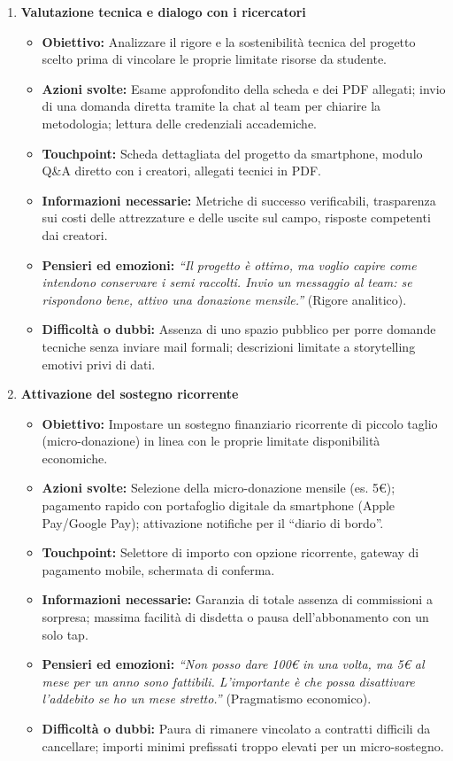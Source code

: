 \documentclass[11pt,a4paper]{article}
\begin{document}
\begin{enumerate}
        \item \textbf{Valutazione tecnica e dialogo con i ricercatori}
        \begin{itemize}
            \item \textbf{Obiettivo:} Analizzare il rigore e la sostenibilità tecnica del progetto scelto prima di vincolare le proprie limitate risorse da studente.
            \item \textbf{Azioni svolte:} Esame approfondito della scheda e dei PDF allegati; invio di una domanda diretta tramite la chat al team per chiarire la metodologia; lettura delle credenziali accademiche.
            \item \textbf{Touchpoint:} Scheda dettagliata del progetto da smartphone, modulo Q\&A diretto con i creatori, allegati tecnici in PDF.
            \item \textbf{Informazioni necessarie:} Metriche di successo verificabili, trasparenza sui costi delle attrezzature e delle uscite sul campo, risposte competenti dai creatori.
            \item \textbf{Pensieri ed emozioni:} \textit{``Il progetto è ottimo, ma voglio capire come intendono conservare i semi raccolti. Invio un messaggio al team: se rispondono bene, attivo una donazione mensile.''} (Rigore analitico).
            \item \textbf{Difficoltà o dubbi:} Assenza di uno spazio pubblico per porre domande tecniche senza inviare mail formali; descrizioni limitate a storytelling emotivi privi di dati.
        \end{itemize}

        \item \textbf{Attivazione del sostegno ricorrente}
        \begin{itemize}
            \item \textbf{Obiettivo:} Impostare un sostegno finanziario ricorrente di piccolo taglio (micro-donazione) in linea con le proprie limitate disponibilità economiche.
            \item \textbf{Azioni svolte:} Selezione della micro-donazione mensile (es. 5€); pagamento rapido con portafoglio digitale da smartphone (Apple Pay/Google Pay); attivazione notifiche per il ``diario di bordo''.
            \item \textbf{Touchpoint:} Selettore di importo con opzione ricorrente, gateway di pagamento mobile, schermata di conferma.
            \item \textbf{Informazioni necessarie:} Garanzia di totale assenza di commissioni a sorpresa; massima facilità di disdetta o pausa dell'abbonamento con un solo tap.
            \item \textbf{Pensieri ed emozioni:} \textit{``Non posso dare 100€ in una volta, ma 5€ al mese per un anno sono fattibili. L'importante è che possa disattivare l'addebito se ho un mese stretto.''} (Pragmatismo economico).
            \item \textbf{Difficoltà o dubbi:} Paura di rimanere vincolato a contratti difficili da cancellare; importi minimi prefissati troppo elevati per un micro-sostegno.
        \end{itemize}


\end{enumerate}
\end{document}
